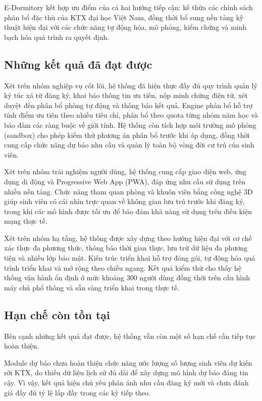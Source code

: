 \documentclass[../DoAn.tex]{subfiles}
\begin{document}
E-Dormitory kết hợp ưu điểm của cả hai hướng tiếp cận: kế thừa các chính sách phân bổ đặc thù của KTX đại học Việt Nam, đồng thời bổ sung nền tảng kỹ thuật hiện đại với các chức năng tự động hóa, mô phỏng, kiểm chứng và minh bạch hóa quá trình ra quyết định.


\subsection{Những kết quả đã đạt được}
\label{subsection:6.1.2}

Xét trên nhóm nghiệp vụ cốt lõi, hệ thống đã hiện thực đầy đủ quy trình quản lý ký túc xá từ đăng ký, khai báo thông tin ưu tiên, nộp minh chứng điện tử, xét duyệt đến phân bổ phòng tự động và thông báo kết quả. Engine phân bổ hỗ trợ tính điểm ưu tiên theo nhiều tiêu chí, phân bổ theo quota từng nhóm năm học và bảo đảm các ràng buộc về giới tính. Hệ thống còn tích hợp môi trường mô phỏng (sandbox) cho phép kiểm thử phương án phân bổ trước khi áp dụng, đồng thời cung cấp chức năng dự báo nhu cầu và quản lý toàn bộ vòng đời cư trú của sinh viên.

Xét trên nhóm trải nghiệm người dùng, hệ thống cung cấp giao diện web, ứng dụng di động và Progressive Web App (PWA), đáp ứng nhu cầu sử dụng trên nhiều nền tảng. Chức năng tham quan phòng và khuôn viên bằng công nghệ 3D giúp sinh viên có cái nhìn trực quan về không gian lưu trú trước khi đăng ký, trong khi các mô hình được tối ưu để bảo đảm khả năng sử dụng trên điều kiện mạng thực tế.

Xét trên nhóm hạ tầng, hệ thống được xây dựng theo hướng hiện đại với cơ chế xác thực đa phương thức, thông báo thời gian thực, lưu trữ dữ liệu đa phương tiện và nhiều lớp bảo mật. Kiến trúc triển khai hỗ trợ đóng gói, tự động hóa quá trình triển khai và mở rộng theo chiều ngang. Kết quả kiểm thử cho thấy hệ thống vận hành ổn định ở mức khoảng 300 người dùng đồng thời trên cấu hình máy chủ phổ thông và sẵn sàng triển khai trong thực tế.

\subsection{Hạn chế còn tồn tại}
\label{subsection:6.1.3}

Bên cạnh những kết quả đạt được, hệ thống vẫn còn một số hạn chế cần tiếp tục hoàn thiện.

Module dự báo chưa hoàn thiện chức năng ước lượng số lượng sinh viên dự kiến rời KTX, do thiếu dữ liệu lịch sử đủ dài để xây dựng mô hình dự báo đáng tin cậy. Vì vậy, kết quả hiện chủ yếu phản ánh nhu cầu đăng ký mới và chưa đánh giá đầy đủ tỷ lệ lấp đầy trong các kỳ tiếp theo.
\end{document}
